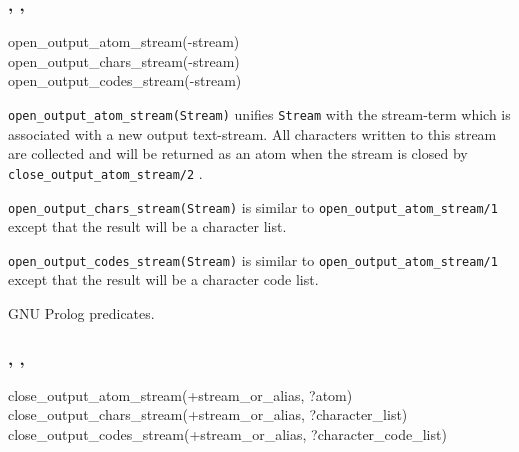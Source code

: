 \subsubsection{,\label{open-output-atom-stream/1}
               , \\
               }


\begin{TemplatesOneCol}
open\_output\_atom\_stream(-stream)\\
open\_output\_chars\_stream(-stream)\\
open\_output\_codes\_stream(-stream)

\end{TemplatesOneCol}

\Description

\texttt{open\_output\_atom\_stream(Stream)} unifies \texttt{Stream} with the
stream-term which is associated with a new output text-stream. All characters
written to this stream are collected and will be returned as an atom when
the stream is closed by \texttt{close\_output\_atom\_stream/2}
.

\texttt{open\_output\_chars\_stream(Stream)} is similar to
\texttt{open\_output\_atom\_stream/1} except that the result will be a
character list.

\texttt{open\_output\_codes\_stream(Stream)} is similar to
\texttt{open\_output\_atom\_stream/1} except that the result will be a
character code list.

\begin{PlErrors}


\end{PlErrors}

\Portability

GNU Prolog predicates.

\subsubsection{,\label{close-output-atom-stream/2}
               , \\
               }


\begin{TemplatesOneCol}
close\_output\_atom\_stream(+stream\_or\_alias, ?atom)\\
close\_output\_chars\_stream(+stream\_or\_alias, ?character\_list)\\
close\_output\_codes\_stream(+stream\_or\_alias, ?character\_code\_list)

\end{TemplatesOneCol}

